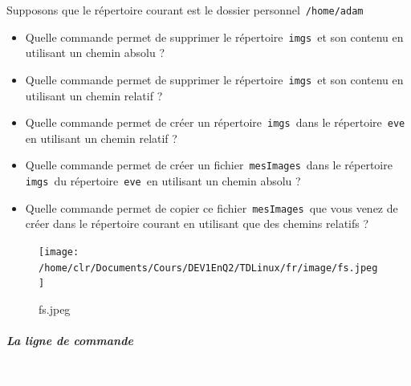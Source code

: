 \documentclass[11pt,a4paper]{article}
\begin{document}
							Supposons que le r\'epertoire courant est le dossier personnel \,\verb|/home/adam|\,
					\begin{itemize}
				
			\item 
										Quelle commande permet de supprimer le r\'epertoire \,\verb|imgs|\, et son contenu en utilisant un chemin absolu ?
										 \textcolor{gray}{\underline{\hspace*{16em}}} 
			\item 
										Quelle commande permet de supprimer le r\'epertoire \,\verb|imgs|\, et son contenu en utilisant un chemin relatif ?
										 \textcolor{gray}{\underline{\hspace*{10em}}} 
			\item 
										Quelle commande permet de cr\'eer un r\'epertoire \,\verb|imgs|\, 
										dans le r\'epertoire \,\verb|eve|\, en utilisant un chemin relatif ?
										 \textcolor{gray}{\underline{\hspace*{16em}}} 
			\item 
										Quelle commande permet de cr\'eer un fichier \,\verb|mesImages|\, 
										dans le r\'epertoire \,\verb|imgs|\, du r\'epertoire \,\verb|eve|\, en utilisant un chemin absolu ?
										 \textcolor{gray}{\underline{\hspace*{16em}}} 
			\item 
										Quelle commande permet de copier ce fichier \,\verb|mesImages|\, 
										que vous venez de cr\'eer dans le r\'epertoire courant en utilisant que des chemins relatifs ?
										 \textcolor{gray}{\underline{\hspace*{16em}}} 
					\end{itemize}
				\begin{figure}[hbt]
				    \begin{center}
					\texttt{[image: /home/clr/Documents/Cours/DEV1EnQ2/TDLinux/fr/image/fs.jpeg]}
						\end{center}
                
                    \caption[fs.jpeg]{fs.jpeg}
                \end{figure}
                    
            \par
        
			
		\subparagraph{La ligne de commande} 
		
                \textcolor{white}{.} \par
            
\end{document}
